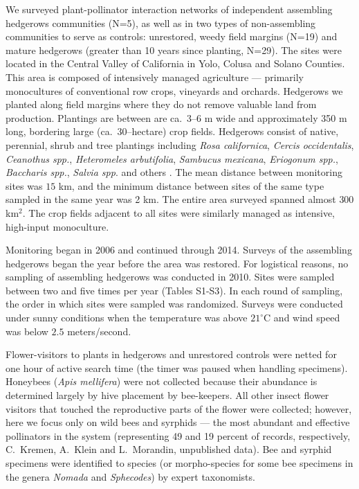 \documentclass[12pt]{article}
\begin{document}
We surveyed plant-pollinator interaction networks of independent
assembling hedgerows communities (N=5), as well as in two types of
non-assembling communities to serve as controls: unrestored, weedy
field margins (N=19) and mature hedgerows (greater than 10 years since
planting, N=29). The sites were located in the Central Valley of
California in Yolo, Colusa and Solano Counties. This area is composed
of intensively managed agriculture --- primarily monocultures of
conventional row crops, vineyards and orchards. Hedgerows we planted
along field margins where they do not remove valuable land from
production. Plantings are between are ca.~3--6 m wide and
approximately 350 m long, bordering large (ca.\ 30--hectare) crop
fields. Hedgerows consist of native, perennial, shrub and tree
plantings including \textit{Rosa californica}, \textit{Cercis
  occidentalis}, \textit{Ceanothus spp.}, \textit{Heteromeles
  arbutifolia}, \textit{Sambucus mexicana}, \textit{Eriogonum spp.},
\textit{Baccharis spp.}, \textit{Salvia spp}. and others
\citep[Fig.~S1][]{menz-2010-4, kremen-2015-602, mgonigle-2015-x}. The
mean distance between monitoring sites was $15$ km, and the minimum
distance between sites of the same type sampled in the same year was 2
km.  The entire area surveyed spanned almost $300$ km$^2$. The crop
fields adjacent to all sites were similarly managed as intensive,
high-input monoculture.

Monitoring began in 2006 and continued through 2014. Surveys of the
assembling hedgerows began the year before the area was restored. For
logistical reasons, no sampling of assembling hedgerows was conducted
in 2010. Sites were sampled between two and five times per year
(Tables S1-S3). In each round of sampling, the order in which sites
were sampled was randomized. Surveys were conducted under sunny
conditions when the temperature was above $21^{\circ}\mathrm{C}$ and
wind speed was below $2.5$ meters/second.

Flower-visitors to plants in hedgerows and unrestored controls were
netted for one hour of active search time (the timer was paused when
handling specimens). Honeybees (\textit{Apis mellifera}) were not
collected because their abundance is determined largely by hive
placement by bee-keepers. All other insect flower visitors that
touched the reproductive parts of the flower were collected; however,
here we focus only on wild bees and syrphids --- the most abundant and
effective pollinators in the system (representing 49 and 19 percent of
records, respectively, C.~Kremen, A.~Klein and L.~Morandin,
unpublished data). Bee and syrphid specimens were identified to
species (or morpho-species for some bee specimens in the genera
\textit{Nomada} and \textit{Sphecodes}) by expert taxonomists.
\end{document}
